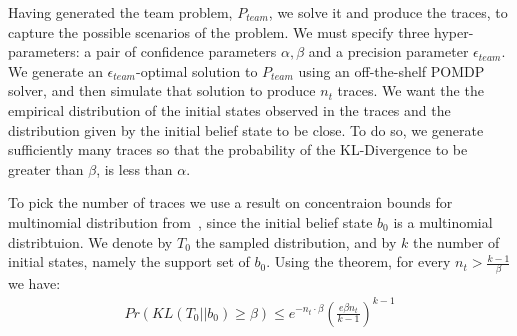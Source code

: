 \documentclass[letterpaper]{article} %
\theoremstyle{definition}
\newcommand{\eliran}[1]{\textbf{[\color{red}ELIRAN:#1]}}
\begin{document}
Having generated the team problem, $P_{team}$, we solve it and produce the traces, to capture the possible scenarios of the problem. We
must specify three hyper-parameters: a pair of confidence parameters $\alpha, \beta$ and a precision parameter $\epsilon_{team}$. We generate an $\epsilon_{team}$-optimal solution
to $P_{team}$ using an off-the-shelf POMDP solver, and then simulate that solution to produce $n_t$ traces.
We want the the empirical distribution of the initial states observed in the traces and the distribution given by the initial belief state to be close.
To do so, we generate sufficiently many traces so that the probability of the KL-Divergence to be greater than $\beta$, is less than $\alpha$.

To pick the number of traces we use
a result on concentraion bounds for multinomial distribution  from~\cite{KLDIV}, since the initial belief state $b_0$ is a multinomial distribtuion. We denote by $T_0$ the sampled distribution, and by $k$ the number of initial states, namely the support set of $b_0$. Using the theorem, for every $n_t > \frac{k-1}{\beta}$ we have:
\begin{align*}
    Pr(KL(T_0 || b_0) \geq \beta) \leq e^{-n_t \cdot \beta} \left( \frac{e \beta n_t}{k-1}\right)^{k-1}
\end{align*}

\end{document}

